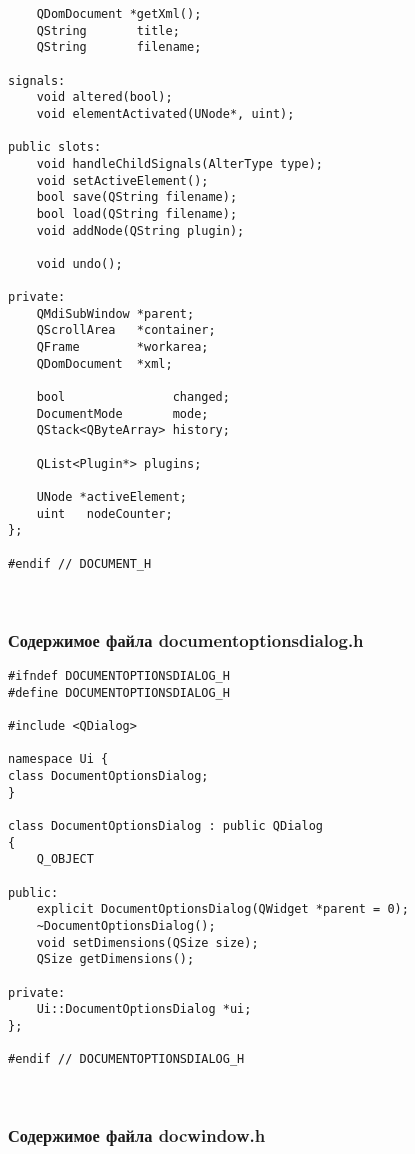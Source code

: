 \begin{lstlisting}
    QDomDocument *getXml();
    QString       title;
    QString       filename;

signals:
    void altered(bool);
    void elementActivated(UNode*, uint);

public slots:
    void handleChildSignals(AlterType type);
    void setActiveElement();
    bool save(QString filename);
    bool load(QString filename);
    void addNode(QString plugin);

    void undo();

private:
    QMdiSubWindow *parent;
    QScrollArea   *container;
    QFrame        *workarea;
    QDomDocument  *xml;

    bool               changed;
    DocumentMode       mode;
    QStack<QByteArray> history;

    QList<Plugin*> plugins;

    UNode *activeElement;
    uint   nodeCounter;
};

#endif // DOCUMENT_H
\end{lstlisting}~\\

\subsubsection*{Содержимое файла documentoptionsdialog.h}

\begin{lstlisting}
#ifndef DOCUMENTOPTIONSDIALOG_H
#define DOCUMENTOPTIONSDIALOG_H

#include <QDialog>

namespace Ui {
class DocumentOptionsDialog;
}

class DocumentOptionsDialog : public QDialog
{
    Q_OBJECT

public:
    explicit DocumentOptionsDialog(QWidget *parent = 0);
    ~DocumentOptionsDialog();
    void setDimensions(QSize size);
    QSize getDimensions();

private:
    Ui::DocumentOptionsDialog *ui;
};

#endif // DOCUMENTOPTIONSDIALOG_H
\end{lstlisting}~\\

\subsubsection*{Содержимое файла docwindow.h}

